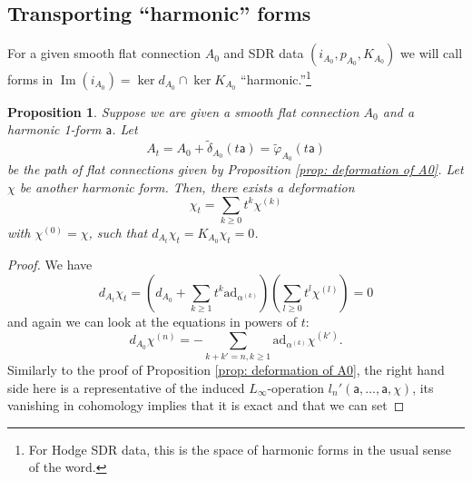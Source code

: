 \documentclass[11pt,a4paper]{amsart}
\theoremstyle{plain} %
\newtheorem{prop}[thm]{Proposition}
\theoremstyle{definition}
\theoremstyle{remark}
\newcommand{\sfa}{\mathsf{a}}
\newcommand{\til}{\widetilde}
\begin{document}
{\subsection{Transporting ``harmonic'' forms}  %

For a given smooth flat connection $A_0$ and SDR data $(i_{A_0},p_{A_0},K_{A_0})$ we will call forms in $\operatorname{Im}(i_{A_0}) = \ker d_{A_0} \cap \ker K_{A_0}$ ``harmonic.''\footnote{For Hodge SDR data, this is the space of harmonic forms in the usual sense of the word.}
\begin{prop}\label{prop: deformation harmonic}
Suppose we are given a smooth flat connection $A_0$ and a harmonic 1-form $\sfa$. Let 
\begin{equation}\label{prop: deformation harmonic A_t = A_0+...}
A_t = A_0 + \til\delta_{A_0}(t\sfa) = \til{\varphi}_{A_0}(t\sfa)
\end{equation}
be the path of flat connections given %
by Proposition \ref{prop: deformation of A0}. %
Let $\chi$ be another harmonic form. Then, there exists a deformation 
\begin{equation}\label{chi_t}
    \chi_t = \sum_{k\geq 0} t^k \chi^{(k)}
\end{equation}
with $\chi^{(0)}= \chi$, such that $d_{A_t}\chi_t =  K_{A_0}\chi_t = 0$.
\end{prop}
\begin{proof}
    We have 
    $$d_{A_t} \chi_t = \left(d_{A_0} + \sum_{k\geq 1}t^k\mathrm{ad}_{\alpha^{(k)}}\right)\left(\sum_{l\geq 0}t^l\chi^{(l)}\right) = 0$$ 
    and again we can look at the equations in powers of $t$: 
    \begin{equation}
        d_{A_0}\chi^{(n)} = -\sum_{k+k' = n, k\geq 1} \mathrm{ad}_{\alpha^{(k)}}\chi^{(k')}.
    \end{equation}
Similarly to the proof of Proposition \ref{prop: deformation of A0}, the right hand side here is a representative of the induced $L_\infty$-operation $l_n'(\sfa,\ldots,\sfa,\chi)$, its vanishing in cohomology implies that it is exact and that we can set 

\end{proof}}
\end{document}
